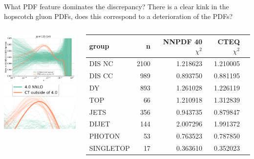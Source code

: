 \documentclass[aspectratio=169,10pt]{beamer}
\begin{document}
\begin{frame}[t]{What PDF feature dominates the discrepancy?}
  There is a clear kink in the hopscotch gluon PDFs, does this correspond to a deterioration of the PDFs?
  \begin{columns}
    \begin{column}{.38\textwidth}
      \includegraphics[width=4cm]{plot_pdfreplicas_g.pdf}\\
      \includegraphics[width=4cm]{zoomin.png}
    \end{column}
    \begin{column}{.6\textwidth}
      \begin{tabular}{lr|r|r|r}
        \toprule
        group &  n &  NNPDF 40 $\chi^{2}$ &  CTEQ $\chi^{2}$ \\
        \midrule
        DIS NC &        2100 &    1.218623 &  1.210005 \\
        DIS CC &         989 &    0.893750 &  0.881195 \\
        \color{blue} DY &         893 &   \color{blue} 1.261028 & \color{blue} 1.226119 \\
        \color{red} TOP &          66 &   \color{red}  1.210918 & \color{red}  1.312839 \\
        \color{amethyst} JETS &         356 &     \color{amethyst} 0.943735 &  \color{amethyst} 0.879847 \\
        DIJET &         144 &    2.007296 &  1.991372 \\
        PHOTON &          53 &    0.763523 &  0.787850 \\
        SINGLETOP &          17 &    0.363610 &  0.352023 \\
        \bottomrule
      \end{tabular}
    \end{column}
  \end{columns}
\end{frame}
\end{document}
